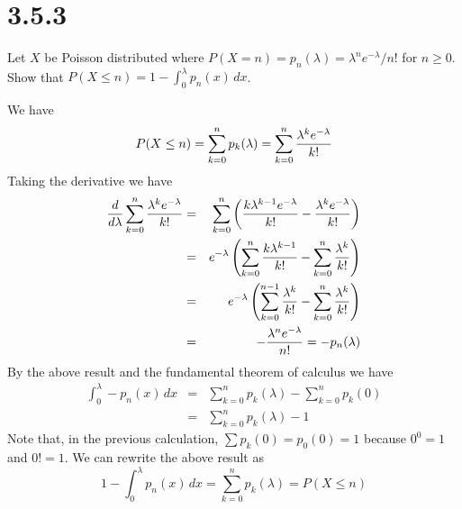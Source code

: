 \section*{3.5.3}
Let $X$ be Poisson distributed where 
$P(X=n)=p_n(\lambda)=\lambda^ne^{-\lambda}/n!$
for $n\ge0$. Show that
$P(X\le n)=1-\int_0^\lambda p_n(x)\,dx$.

\bigskip
\noindent
We have
$$P(X\le n)=\sum_{k=0}^np_k(\lambda)
=\sum_{k=0}^n{\lambda^ke^{-\lambda}\over k!}$$
Taking the derivative we have
\begin{eqnarray*}
{d\over d\lambda}\sum_{k=0}^n{\lambda^ke^{-\lambda}\over k!}
&=&\sum_{k=0}^n\left({k\lambda^{k-1}e^{-\lambda}\over k!}
-{\lambda^ke^{-\lambda}\over k!}\right)
\\
&=&e^{-\lambda}\left(
\sum_{k=0}^n{k\lambda^{k-1}\over k!}
-\sum_{k=0}^n{\lambda^k\over k!}
\right)
\\
&=&e^{-\lambda}\left(
\sum_{k=0}^{n-1}{\lambda^k\over k!}
-\sum_{k=0}^n{\lambda^k\over k!}
\right)
\\
&=&-{\lambda^ne^{-\lambda}\over n!}=-p_n(\lambda)
\end{eqnarray*}
By the above result and the fundamental theorem of calculus we have
\begin{eqnarray*}
\int_0^\lambda-p_n(x)\,dx
&=&\sum_{k=0}^n p_k(\lambda)
-\sum_{k=0}^n p_k(0)
\\
&=&\sum_{k=0}^n p_k(\lambda)-1
\end{eqnarray*}
Note that, in the previous calculation, $\sum p_k(0)=p_0(0)=1$
because $0^0=1$ and $0!=1$.
We can rewrite the above result as
$$1-\int_0^\lambda p_n(x)\,dx
=\sum_{k=0}^n p_k(\lambda)=P(X\le n)$$
